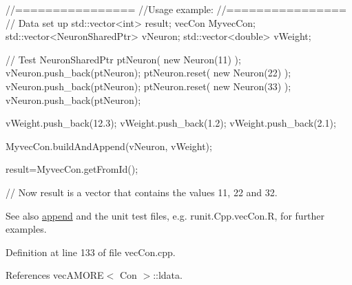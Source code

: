 \begin{DoxyCode}
        //================
        //Usage example:
        //================
        // Data set up
                std::vector<int> result;
                vecCon MyvecCon;
                std::vector<NeuronSharedPtr> vNeuron;
                std::vector<double> vWeight;


        // Test
                NeuronSharedPtr ptNeuron( new Neuron(11) );
                vNeuron.push_back(ptNeuron);
                ptNeuron.reset( new Neuron(22) );
                vNeuron.push_back(ptNeuron);
                ptNeuron.reset( new Neuron(33) );
                vNeuron.push_back(ptNeuron);

                vWeight.push_back(12.3);
                vWeight.push_back(1.2);
                vWeight.push_back(2.1);

                MyvecCon.buildAndAppend(vNeuron, vWeight);

                result=MyvecCon.getFromId();

        // Now result is a vector that contains the values 11, 22 and 32.
\end{DoxyCode}


\begin{DoxySeeAlso}{See also}
\hyperlink{classvec_a_m_o_r_e_ab060ffa67e85997fc4236bedfd2f17b6}{append} and the unit test files, e.g. runit.Cpp.vecCon.R, for further examples. 
\end{DoxySeeAlso}


Definition at line 133 of file vecCon.cpp.



References vecAMORE$<$ Con $>$::ldata.


